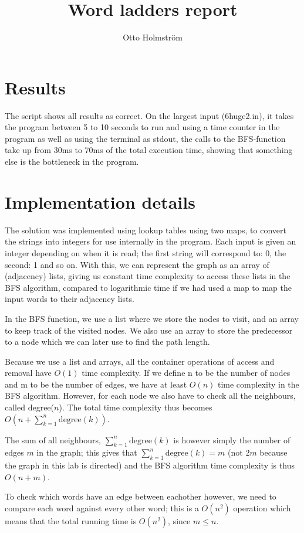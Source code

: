 \documentclass{article}
\title{Word ladders report}
\author{Otto Holmström}
\begin{document}
  \maketitle

  \section{Results}


The script shows all results as correct. On the largest input (6huge2.in), it takes the program between 5 to 10 seconds to run and using a time counter in the program as well as using the terminal as stdout, the calls to the BFS-function take up from 30ms to 70ms of the total execution time, showing that something else is the bottleneck in the program.

  \section{Implementation details}


The solution was implemented using lookup tables using two maps, to convert the strings into integers for use internally in the program. Each input is given an integer depending on when it is read; the first string will correspond to: 0, the second: 1 and so on. With this, we can represent the graph as an array of (adjacency) lists, giving us constant time complexity to access these lists in the BFS algorithm, compared to logarithmic time if we had used a map to map the input words to their adjacency lists.

In the BFS function, we use a list where we store the nodes to visit, and an array to keep track of the visited nodes. We also use an array to store the predecessor to a node which we can later use to find the path length.

Because we use a list and arrays, all the container operations of access and removal have $O(1)$ time complexity. If we define n to be the number of nodes and m to be the number of edges, we have at least $O(n)$ time complexity in the BFS algorithm. However, for each node we also have to check all the neighbours, called degree($n$). The total time complexity thus becomes
$O(n+\sum_{k=1}^n \text{degree}(k))$.

The sum of all neighbours, $\sum_{k=1}^n \text{degree}(k)$ is however simply the number of edges $m$ in the graph; this gives that $\sum_{k=1}^n \text{degree}(k) = m$ (not $2m$ because the graph in this lab is directed) and the BFS algorithm time complexity is thus $O(n + m)$.

To check which words have an edge between eachother however, we need to compare each word against every other word; this is a $O(n^2)$ operation which means that the total running time is $O(n^2)$, since $m\leq n$.
\end{document}

